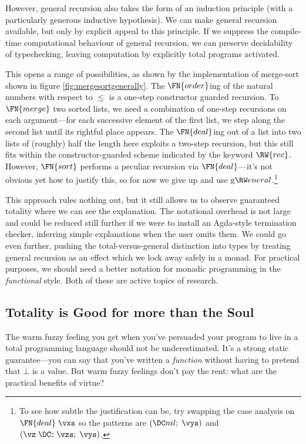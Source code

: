 \documentclass{fundam}
\begin{document}
However, general recursion also takes the form of an induction
principle (with a particularly generous inductive hypothesis). We can
make general recursion available, but only by explicit appeal to this
principle. If we suppress the compile-time computational behaviour of
general recursion, we can preserve decidability of typechecking, leaving
computation by explicitly total programs activated.

This opens a range of possibilities, as shown by the implementation of
merge-sort shown in figure \ref{fig:mergesortgenerally}. The
$\FN{order}$ing of the natural numbers with respect to $\le$ is a
one-step constructor guarded recursion. To $\FN{merge}$ two sorted
lists, we need a combination of one-step recursions on each
argument---for each successive element of the first list, we step
along the second list until its rightful place appears. The
$\FN{deal}$ing out of a list into two lists of (roughly) half the
length here exploits a two-step recursion, but this still fits within
the constructor-guarded scheme indicated by the keyword $\RW{rec}$.
However, $\FN{sort}$ performs a peculiar recursion via
$\FN{deal}$---it's not obvious yet how to justify this, so for now we give
up and use $\general$.\footnote{To see how subtle the justification
can be, try swapping the case analysis on $\FN{deal}\;\vxs$ so the
patterns are $(\nil;\;\vys)$ and $(\vz\cons\vzs;\;\vys)$.}


This approach rules nothing out, but it still allows us to observe
guaranteed totality where we can see the explanation. The notational
overhead is not large and could be reduced still further if we were to
install an Agda-style termination checker, inferring simple
explanations when the user omits them.  We could go even further,
pushing the total-versus-general distinction into types by treating
general recursion as an effect which we lock away safely in a monad.
For practical purposes, we should need a better notation for monadic
programming in the \emph{functional} style.  Both of these are active
topics of research.


\subsection{Totality is Good for more than the Soul}

The warm fuzzy feeling you get when you've persuaded your program to live
in a total programming language should not be underestimated. It's a
strong static guarantee---you can say that you've written a \emph{function}
without having to pretend that $\bot$ is a value.
But warm fuzzy feelings don't pay the rent: what are the practical benefits
of virtue?
\end{document}

